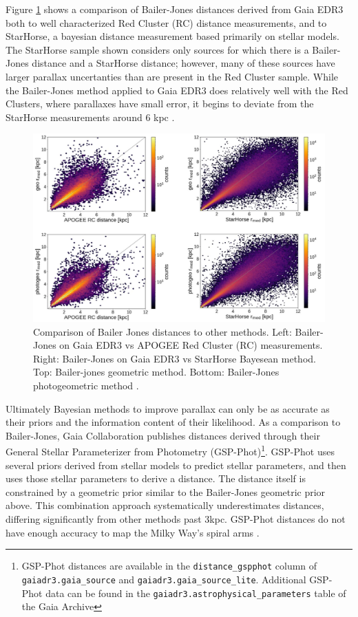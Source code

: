 \documentclass[twocolumn]{aastex631}
\begin{document}
Figure \ref{fig:bailerjones} shows a comparison of Bailer-Jones distances derived from Gaia EDR3 both to well characterized Red Cluster (RC) distance measurements, and to StarHorse, a bayesian distance measurement based primarily on stellar models\cite{queirozStarHorse2018}. The StarHorse sample shown considers only sources for which there is a Bailer-Jones distance and a StarHorse distance; however, many of these sources have larger parallax uncertanties than are present in the Red Cluster sample.  While the Bailer-Jones method applied to Gaia EDR3 does relatively well with the Red Clusters, where parallaxes have small error, it begins to deviate from the StarHorse measurements around 6 kpc \cite{bailer-jonesEstimating2021}. 
\begin{figure}
	\includegraphics[width=\columnwidth]{bailerjonesverification.png}
	\caption{Comparison of Bailer Jones distances to other methods. Left: Bailer-Jones on Gaia EDR3 vs APOGEE Red Cluster (RC) measurements. Right: Bailer-Jones on Gaia EDR3 vs StarHorse Bayesean method. Top: Bailer-jones geometric method. Bottom: Bailer-Jones photogeometric method \citep{bailer-jonesEstimating2021}.}
	\label{fig:bailerjones}
\end{figure}

Ultimately Bayesian methods to improve parallax can only be as accurate as their priors and the information content of their likelihood. As a comparison to Bailer-Jones, Gaia Collaboration publishes distances derived through their General Stellar Parameterizer from Photometry (GSP-Phot)\footnote{GSP-Phot distances are available in the \texttt{distance\_gspphot} column of \texttt{gaiadr3.gaia\_source} and \texttt{gaiadr3.gaia\_source\_lite}. Additional GSP-Phot data can be found in the \texttt{gaiadr3.astrophysical\_parameters} table of the Gaia Archive}. GSP-Phot uses several priors derived from stellar models to predict stellar parameters, and then uses those stellar parameters to derive a distance. The distance itself is constrained by a geometric prior similar to the Bailer-Jones geometric prior above. This combination approach systematically underestimates distances, differing significantly from other methods past 3kpc. GSP-Phot distances do not have enough accuracy to map the Milky Way's spiral arms \citep{andraeGaia2022}.
\end{document}
